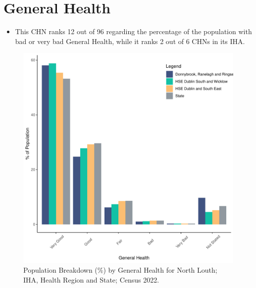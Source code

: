 \documentclass{article}
\begin{document}
\pagebreak

\section{General Health}\label{sect:GenHealth}
\begin{itemize}
\item  This CHN ranks  12 out of 96 regarding the percentage of the population with bad or very bad General Health, while it ranks   2 out of 6 CHNs in its IHA.
\end{itemize}
\begin{figure}[h]
	\centering
	\includegraphics[width = 150mm]{../figures/GenED.pdf}
	\caption{Population Breakdown (\%) by General Health for North Louth; IHA, Health Region and State;  Census 2022.}
	\label{fig:2ae19629-1a6a-13a3-e055-000000000001}
	\end{figure}
\end{document}
